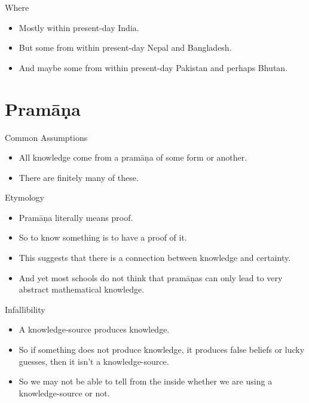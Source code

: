 \documentclass[
  17pt,
  letterpaper,
  ignorenonframetext,
  aspectratio=169,
]{beamer}
\providecommand{\tightlist}{%
  \setlength{\itemsep}{0pt}\setlength{\parskip}{0pt}}\usepackage{longtable,booktabs,array}
\begin{document}
\begin{frame}{Where}
\protect\hypertarget{where-1}{}
\begin{itemize}[<+->]
\tightlist
\item
  Mostly within present-day India.
\item
  But some from within present-day Nepal and Bangladesh.
\item
  And maybe some from within present-day Pakistan and perhaps Bhutan.
\end{itemize}
\end{frame}

\hypertarget{pramux101ux1e47a}{%
\section{Pramāṇa}\label{pramux101ux1e47a}}

\begin{frame}{Common Assumptions}
\protect\hypertarget{common-assumptions}{}
\begin{itemize}[<+->]
\tightlist
\item
  All knowledge come from a pramāṇa of some form or another.
\item
  There are finitely many of these.
\end{itemize}
\end{frame}

\begin{frame}{Etymology}
\protect\hypertarget{etymology}{}
\begin{itemize}[<+->]
\tightlist
\item
  Pramāṇa literally means proof.
\item
  So to know something is to have a proof of it.
\item
  This suggests that there is a connection between knowledge and
  certainty.
\item
  And yet most schools do not think that pramāṇas can only lead to very
  abstract mathematical knowledge.
\end{itemize}
\end{frame}

\begin{frame}{Infallibility}
\protect\hypertarget{infallibility}{}
\begin{itemize}[<+->]
\tightlist
\item
  A knowledge-source produces knowledge.
\item
  So if something does not produce knowledge, it produces false beliefs
  or lucky guesses, then it isn't a knowledge-source.
\item
  So we may not be able to tell from the inside whether we are using a
  knowledge-source or not.
\end{itemize}
\end{frame}
\end{document}
